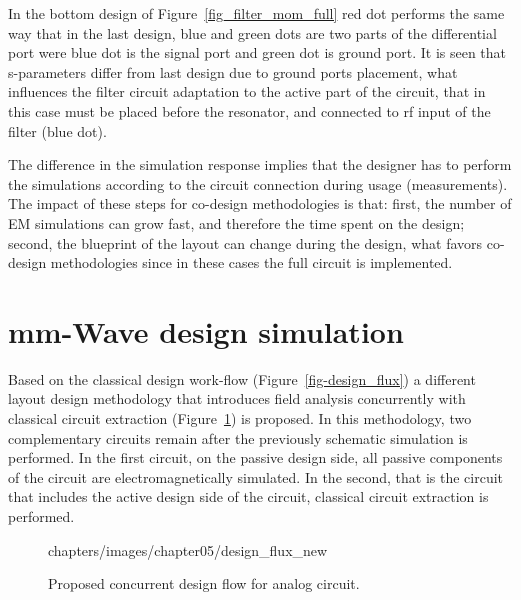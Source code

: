 In the bottom design of Figure~\ref{fig_filter_mom_full} red dot performs the same way that in the last design, blue and green dots are two parts of the differential port were blue dot is the signal port and green dot is ground port. It is seen that s-parameters differ from last design due to ground ports placement, what influences the filter circuit adaptation to the active part of the circuit, that in this case must be placed before the resonator, and connected to \gls{rf} input of the filter (blue dot).

The difference in the simulation response implies that the designer has to perform the simulations according to the circuit connection during usage (measurements). The impact of these steps for co-design methodologies is that: first, the number of EM simulations can grow fast, and therefore the time spent on the design; second, the blueprint of the layout can change during the design, what favors co-design methodologies since in these cases the full circuit is implemented.

\section{mm-Wave design simulation}
Based on the classical design work-flow (Figure~\ref{fig-design_flux}) a different layout design methodology that introduces field analysis concurrently with classical circuit extraction (Figure~\ref{fig-proposed_flow}) is proposed. In this methodology, two complementary circuits remain after the previously schematic simulation is performed. In the first circuit, on the passive design side, all passive components of the circuit are electromagnetically simulated. In the second, that is the circuit that includes the active design side of the circuit, classical circuit extraction is performed.
\begin{figure}%
\centering
	\begin{overpic}[scale=1]{chapters/images/chapter05/design_flux_new}
	\end{overpic}
\caption{Proposed concurrent design flow for analog circuit.}
\label{fig-proposed_flow}
\end{figure}

